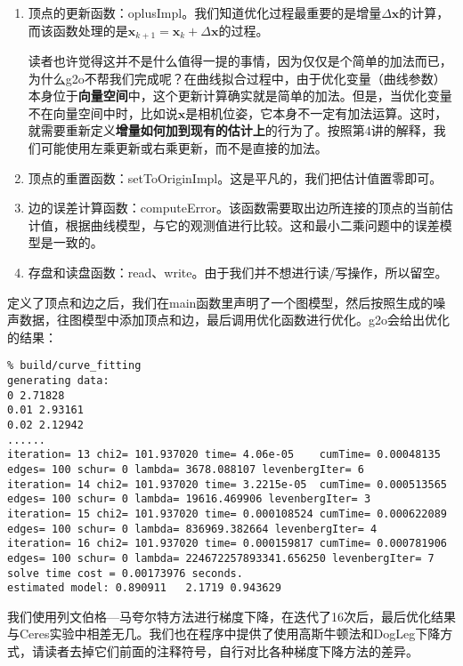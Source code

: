 \begin{enumerate}
	\item 顶点的更新函数：oplusImpl。我们知道优化过程最重要的是增量$\Delta \bm{x}$的计算，而该函数处理的是$\bm{x}_{k+1} = \bm{x}_k + \Delta \bm{x}$的过程。
	
	读者也许觉得这并不是什么值得一提的事情，因为仅仅是个简单的加法而已，为什么g2o不帮我们完成呢？在曲线拟合过程中，由于优化变量（曲线参数）本身位于\textbf{向量空间}中，这个更新计算确实就是简单的加法。但是，当优化变量不在向量空间中时，比如说$\bm{x}$是相机位姿，它本身不一定有加法运算。这时，就需要重新定义\textbf{增量如何加到现有的估计上}的行为了。按照第4讲的解释，我们可能使用左乘更新或右乘更新，而不是直接的加法。
	
	\item 顶点的重置函数：setToOriginImpl。这是平凡的，我们把估计值置零即可。
	
	\item 边的误差计算函数：computeError。该函数需要取出边所连接的顶点的当前估计值，根据曲线模型，与它的观测值进行比较。这和最小二乘问题中的误差模型是一致的。
	
	\item 存盘和读盘函数：read、write。由于我们并不想进行读/写操作，所以留空。
\end{enumerate}

定义了顶点和边之后，我们在main函数里声明了一个图模型，然后按照生成的噪声数据，往图模型中添加顶点和边，最后调用优化函数进行优化。g2o会给出优化的结果：

\begin{lstlisting}
% build/curve_fitting 
generating data: 
0 2.71828
0.01 2.93161
0.02 2.12942
......
iteration= 13 chi2= 101.937020 time= 4.06e-05    cumTime= 0.00048135  edges= 100 schur= 0 lambda= 3678.088107 levenbergIter= 6
iteration= 14 chi2= 101.937020 time= 3.2215e-05  cumTime= 0.000513565 edges= 100 schur= 0 lambda= 19616.469906 levenbergIter= 3
iteration= 15 chi2= 101.937020 time= 0.000108524 cumTime= 0.000622089 edges= 100 schur= 0 lambda= 836969.382664 levenbergIter= 4
iteration= 16 chi2= 101.937020 time= 0.000159817 cumTime= 0.000781906 edges= 100 schur= 0 lambda= 224672257893341.656250 levenbergIter= 7
solve time cost = 0.00173976 seconds. 
estimated model: 0.890911   2.1719 0.943629
\end{lstlisting}

我们使用列文伯格—马夸尔特方法进行梯度下降，在迭代了16次后，最后优化结果与Ceres实验中相差无几。我们也在程序中提供了使用高斯牛顿法和DogLeg下降方式，请读者去掉它们前面的注释符号，自行对比各种梯度下降方法的差异。

